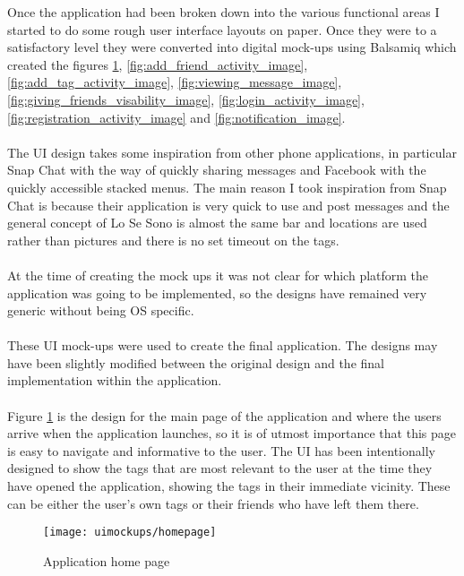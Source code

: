 Once the application had been broken down into the various functional areas I started to do some rough user interface layouts on paper. Once they were to a satisfactory level they were converted into digital mock-ups using Balsamiq which created the figures \ref{fig:application_home_page_image}, \ref{fig:add_friend_activity_image}, \ref{fig:add_tag_activity_image}, \ref{fig:viewing_message_image}, \ref{fig:giving_friends_visability_image}, \ref{fig:login_activity_image}, \ref{fig:registration_activity_image} and \ref{fig:notification_image}. \\
\\
The UI design takes some inspiration from other phone applications, in particular Snap Chat with the way of quickly sharing messages and Facebook with the quickly accessible stacked menus. The main reason I took inspiration from Snap Chat is because their application is very quick to use and post messages and the general concept of Lo Se Sono is almost the same bar and locations are used rather than pictures and there is no set timeout on the tags.\\
\\
At the time of creating the mock ups it was not clear for which platform the application was going to be implemented, so the designs have remained very generic without being OS specific.\\
\\
These UI mock-ups were used to create the final application. The designs may have been slightly modified between the original design and the final implementation within the application.\\
\\
Figure \ref{fig:application_home_page_image} is the design for the main page of the application and where the users arrive when the application launches, so it is of utmost importance that this page is easy to navigate and informative to the user. The UI has been intentionally designed to show the tags that are most relevant to the user at the time they have opened the application, showing the tags in their immediate vicinity. These can be either the user's own tags or their friends who have left them there.\\

\begin{figure}[H]
    \centering
    \texttt{[image: uimockups/homepage]}
    \caption{Application home page}
    \label{fig:application_home_page_image}
\end{figure}

